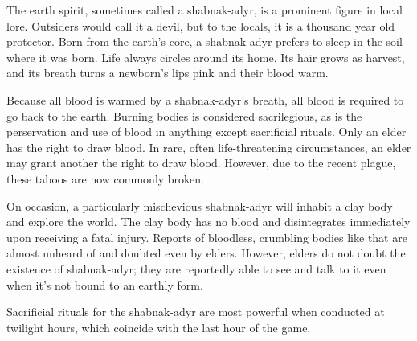 \documentclass[blue]{Pestilence}
\begin{document}
\name{\bShabnakAdyr{}}

The earth spirit, sometimes called a shabnak-adyr, is a prominent figure in local lore. Outsiders would call it a devil, but to the locals, it is a thousand year old protector. Born from the earth's core, a shabnak-adyr prefers to sleep in the soil where it was born. Life always circles around its home. Its hair grows as harvest, and its breath turns a newborn's lips pink and their blood warm. 

Because all blood is warmed by a shabnak-adyr's breath, all blood is required to go back to the earth. Burning bodies is considered sacrilegious, as is the perservation and use of blood in anything except sacrificial rituals. Only an elder has the right to draw blood. In rare, often life-threatening circumstances, an elder may grant another the right to draw blood. However, due to the recent plague, these taboos are now commonly broken.

On occasion, a particularly mischevious shabnak-adyr will inhabit a clay body and explore the world. The clay body has no blood and disintegrates immediately upon receiving a fatal injury. Reports of bloodless, crumbling bodies like that are almost unheard of and doubted even by elders. However, elders do not doubt the existence of shabnak-adyr; they are reportedly able to see and talk to it even when it's not bound to an earthly form.   

Sacrificial rituals for the shabnak-adyr are most powerful when conducted at twilight hours, which coincide with the last hour of the game.
\end{document}
